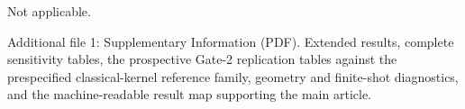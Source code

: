 \documentclass[referee,lineno,pdflatex,sn-vancouver-num]{sn-jnl}
\theoremstyle{thmstyleone}%
\theoremstyle{thmstyletwo}%
\theoremstyle{thmstylethree}%
\begin{document}
Not applicable.

Additional file 1: Supplementary Information (PDF). Extended results, complete sensitivity tables, the prospective Gate-2 replication tables against the prespecified classical-kernel reference family, geometry and finite-shot diagnostics, and the machine-readable result map supporting the main article.




\end{document}
